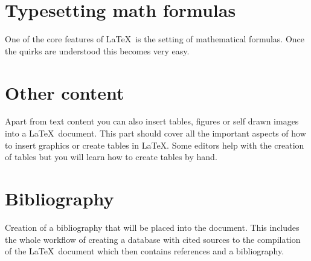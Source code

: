 \documentclass[10pt]{scrartcl}
\begin{document}
    \section{Typesetting math formulas}
    One of the core features of \LaTeX\ is the setting of mathematical formulas. Once the quirks are understood this becomes very easy.

    \section{Other content}
    Apart from text content you can also insert tables, figures or self drawn images into a \LaTeX\ document. This part should cover all the important aspects of how to insert graphics or create tables in \LaTeX. Some editors help with the creation of tables but you will learn how to create tables by hand.

    \section{Bibliography}
    Creation of a bibliography that will be placed into the document. This includes the whole workflow of creating a database with cited sources to the compilation of the \LaTeX\ document which then contains references and a bibliography.
    
\end{document}
